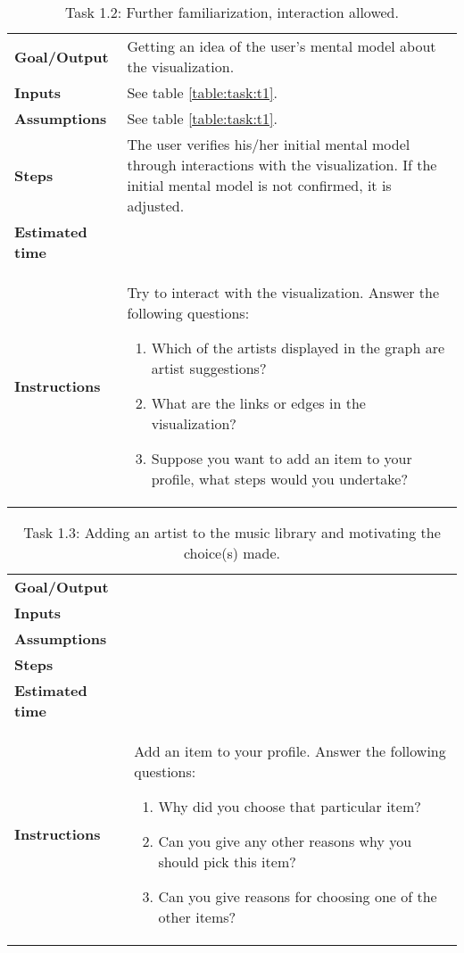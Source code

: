 \begin{table}
	\caption{Task 1.2: Further familiarization, interaction allowed.}
	\begin{tabular}{ p{80px} | p{350px} }
		\hline
		\textbf{Goal/Output}			& Getting an idea of the user's mental model about the visualization. \\
		\textbf{Inputs}						& See table \ref{table:task:t1}. \\
		\textbf{Assumptions}			& See table \ref{table:task:t1}. \\
		\textbf{Steps}						& The user verifies his/her initial mental model through interactions with the visualization. If the initial mental model is not confirmed, it is adjusted. \\
		\textbf{Estimated time} 	& \\
		\textbf{Instructions}			&
		Try to interact with the visualization. Answer the following questions:
		\begin{enumerate}
			\item Which of the artists displayed in the graph are artist suggestions?
			\item What are the links or edges in the visualization?
			\item	Suppose you want to add an item to your profile, what steps would you undertake?
		\end{enumerate}
		\\
		\hline
	\end{tabular}
	\label{table:task:t2}
\end{table}


\begin{table}
	\caption{Task 1.3: Adding an artist to the music library and motivating the choice(s) made.}
	\begin{tabular}{ p{80px} | p{350px} }
		\hline
		\textbf{Goal/Output}			& \\
		\textbf{Inputs}						& \\
		\textbf{Assumptions}			& \\
		\textbf{Steps}						& \\
		\textbf{Estimated time} 	& \\
		\textbf{Instructions}			&
		Add an item to your profile. Answer the following questions:
		\begin{enumerate}
			\item Why did you choose that particular item?
			\item Can you give any other reasons why you should pick this item?
			\item Can you give reasons for choosing one of the other items?
		\end{enumerate}
		\\
		\hline
	\end{tabular}
	\label{table:task:t3}
\end{table}



